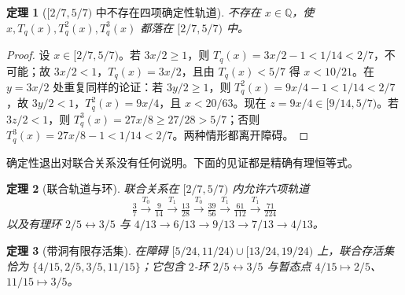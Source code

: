 \documentclass[11pt,a4paper]{article}
\newtheorem{theorem}{定理}[section]
\theoremstyle{remark}
\newcommand{\Q}{\mathbb{Q}}
\begin{document}
\begin{theorem}[$[2/7,5/7)$ 中不存在四项确定性轨道]
\label{thm:exit}
不存在 $x \in \Q$，使 $x, T_{q}(x), T_{q}^{2}(x), T_{q}^{3}(x)$ 都落在 $[2/7,5/7)$ 中。
\end{theorem}

\begin{proof}
设 $x \in [2/7,5/7)$。若 $3x/2 \ge 1$，则 $T_{q}(x) = 3x/2 - 1 < 1/14 < 2/7$，不可能；故 $3x/2 < 1$，$T_{q}(x) = 3x/2$，且由 $T_{q}(x) < 5/7$ 得 $x < 10/21$。在 $y = 3x/2$ 处重复同样的论证：若 $3y/2 \ge 1$，则 $T_{q}^{2}(x) = 9x/4 - 1 < 1/14 < 2/7$，故 $3y/2 < 1$，$T_{q}^{2}(x) = 9x/4$，且 $x < 20/63$。现在 $z = 9x/4 \in [9/14,5/7)$。若 $3z/2 < 1$，则 $T_{q}^{3}(x) = 27x/8 \ge 27/28 > 5/7$；否则 $T_{q}^{3}(x) = 27x/8 - 1 < 1/14 < 2/7$。两种情形都离开障碍。
\end{proof}

确定性退出对联合关系没有任何说明。下面的见证都是精确有理恒等式。

\begin{theorem}[联合轨道与环]
\label{thm:joint}
联合关系在 $[2/7,5/7)$ 内允许六项轨道
\[
  \tfrac37 \xrightarrow{T_{0}} \tfrac9{14} \xrightarrow{T_{1}} \tfrac{13}{28}
  \xrightarrow{T_{0}} \tfrac{39}{56} \xrightarrow{T_{1}} \tfrac{61}{112}
  \xrightarrow{T_{1}} \tfrac{71}{224}
\]
以及有理环 $2/5 \leftrightarrow 3/5$ 与 $4/13 \to 6/13 \to 9/13 \to 7/13 \to 4/13$。
\end{theorem}

\begin{theorem}[带洞有限存活集]
\label{thm:holed}
在障碍 $[5/24,11/24) \cup [13/24,19/24)$ 上，联合存活集恰为 $\{4/15,2/5,3/5,11/15\}$；它包含 $2$-环 $2/5 \leftrightarrow 3/5$ 与暂态点 $4/15 \mapsto 2/5$、$11/15 \mapsto 3/5$。
\end{theorem}
\end{document}
